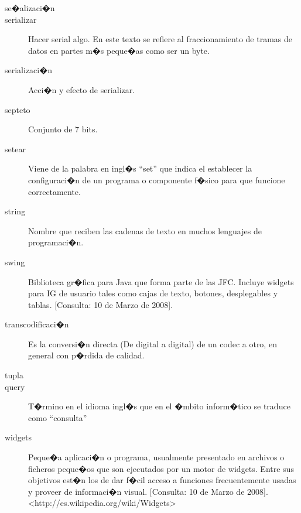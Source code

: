 \begin{description}
	\item[se�alizaci�n]
	
	\item[serializar] Hacer serial algo. En este texto se refiere al fraccionamiento de tramas de datos en partes m�s peque�as como ser un byte.

	\item[serializaci�n] Acci�n y efecto de serializar.
	
	\item[septeto] Conjunto de 7 bits.
	
	\item[setear] Viene de la palabra en ingl�s ``set'' que indica el establecer la configuraci�n de un programa o componente f�sico para que funcione correctamente.
	
	\item[string] Nombre que reciben las cadenas de texto en muchos lenguajes de programaci�n.
	
	\item[swing] Biblioteca gr�fica para Java que forma parte de las \ac{JFC}. Incluye widgets para \ac{IG} de usuario tales como cajas de texto, botones, desplegables y tablas. [Consulta: 10 de Marzo de 2008].%
	
	\item[transcodificaci�n] Es la conversi�n directa (De digital a digital) de un codec a otro, en general con p�rdida de calidad.
	
	\item[tupla]
	
	\item[query] T�rmino en el idioma ingl�s que en el �mbito inform�tico se traduce como ``consulta''
	
	\item[widgets] Peque�a aplicaci�n o programa, usualmente presentado en archivos o ficheros peque�os que son ejecutados por un motor de widgets. Entre sus objetivos est�n los de dar f�cil acceso a funciones frecuentemente usadas y proveer de informaci�n visual. [Consulta: 10 de Marzo de 2008].\\ <http://es.wikipedia.org/wiki/Widgets>




\end{description}